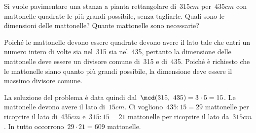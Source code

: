 \begin{esempio}{}{}
Si vuole pavimentare una stanza a pianta rettangolare di~\(315\unit{cm}\) 
per~\(435\unit{cm}\) con mattonelle quadrate le più grandi possibile, 
senza tagliarle. 
Quali sono le dimensioni delle  mattonelle? 
Quante mattonelle sono necessarie?

Poiché le mattonelle devono essere quadrate devono avere il lato tale che 
entri un numero intero di volte sia nel~315 sia nel~435, pertanto la 
dimensione delle mattonelle deve essere un divisore comune
di~315 e di~435. Poiché è richiesto che le mattonelle siano quanto più 
grandi possibile, la dimensione deve essere il massimo divisore comune.

\hspace*{-12mm}\esematt
% 
% 

La soluzione del problema è data quindi dal~\(\mcd(315,~435)=3 \cdot 5=15\). 
Le mattonelle devono avere il lato di~\(15\unit{cm}\).
Ci vogliono~\(435:15=29\) mattonelle per ricoprire il lato 
di~\(435\unit{cm}\) e~\(315:15=21\) mattonelle per ricoprire il lato
da~\(315\unit{cm}\). In tutto occorrono~\(29\cdot21=609\) mattonelle.
\end{esempio}

